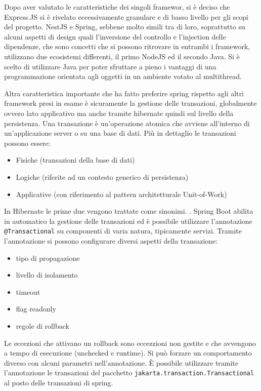 \documentclass[a4paper,11pt]{article}
\begin{document}
Dopo aver valutato le caratteristiche dei singoli framewor, si è deciso che Express.JS si è rivelato eccessivamente granulare e di basso livello per gli scopi del progetto. NestJS e Spring, sebbene molto simili tra di loro, soprattutto su alcuni aspetti di design quali l'inversione del controllo e l'injection delle dipendenze, che sono concetti che si possono ritrovare in entrambi i framework, utilizzano due ecosistemi differenti, il primo NodeJS ed il secondo Java. Si è scelto di utilizzare Java per poter sfruttare a pieno i vantaggi di una programmazione orientata agli oggetti in un ambiente votato al multithread.

Altra caratteristica importante che ha fatto preferire spring rispetto agli altri framework presi in esame è sicuramente la gestione delle transazioni, globalmente ovvero lato applicativo ma anche tramite hibernate quindi sul livello della persistenza. Una transazione è un'operazione atomica che avviene all'interno di un'applicazione server o su una base di dati. Più in dettaglio le transazioni possono essere:
\begin{itemize}
  \item Fisiche (transazioni della base di dati)
  \item Logiche (riferite ad un contesto generico di persistenza)
  \item Applicative (con riferimento al pattern architetturale Unit-of-Work)
\end{itemize}
In Hibernate le prime due vengono trattate come sinonimi. \cite{jbossHibernateUserArch}. Spring Boot abilita in automatico la gestione delle transazioni ed è possibile utilizzare l'annotazione \texttt{@Transactional} su componenti di varia natura, tipicamente servizi. Tramite l'annotazione si possono configurare diversi aspetti della transazione:
\begin{itemize}
  \item tipo di propagazione
  \item livello di isolamento
  \item timeout
  \item flag readonly
  \item regole di rollback
\end{itemize}
Le eccezioni che attivano un rollback sono eccezzioni non gestite e che avvengono a tempo di esecuzione (unchecked e runtime). Si può forzare un comportamento diverso con alcuni parametri nell'annotazione. È possibile utilizzare tramite l'annotazione le transazioni del pacchetto \texttt{jakarta.transaction.Transactional} al posto delle transazioni di spring. \cite{springUsingTransactional}
\end{document}
